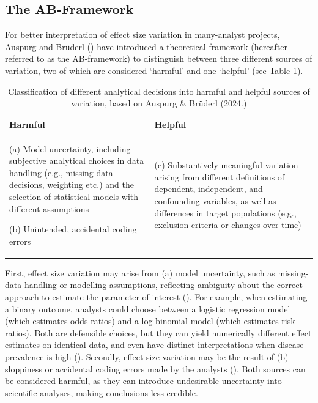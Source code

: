 \documentclass[
  man,
  floatsintext,
  longtable,
  nolmodern,
  notxfonts,
  notimes,
  colorlinks=true,linkcolor=blue,citecolor=blue,urlcolor=blue]{apa7}
\begin{document}
\subsection{The AB-Framework}\label{the-ab-framework}

For better interpretation of effect size variation in many-analyst
projects, Auspurg and Brüderl ()
have introduced a theoretical framework (hereafter referred to as the
AB-framework) to distinguish between three different sources of
variation, two of which are considered `harmful' and one `helpful' (see
Table \ref{tab:AB_framework}).

\begin{table}
\centering
\caption{Classification of different analytical decisions into harmful and helpful sources of variation, based on Auspurg \& Brüderl (2024.)}
\label{tab:AB_framework}
\begin{threeparttable}
\footnotesize
\setlength{\tabcolsep}{10pt}
\renewcommand{\arraystretch}{1.2}

\begin{tabular}{
>{\RaggedRight\arraybackslash}p{7.2cm}
>{\RaggedRight\arraybackslash}p{7.2cm}
}
\toprule
\textbf{Harmful} & \textbf{Helpful} \\
\midrule

(a) Model uncertainty, including subjective analytical choices in data handling (e.g., missing data decisions, weighting etc.) and the selection of statistical models with different assumptions

\vspace{0.4em}
(b) Unintended, accidental coding errors
&
(c) Substantively meaningful variation arising from different definitions of dependent, independent, and confounding variables, as well as differences in target populations (e.g., exclusion criteria or changes over time) \\

\bottomrule
\end{tabular}

\end{threeparttable}
\end{table}

First, effect size variation may arise from (a) model uncertainty, such
as missing-data handling or modelling assumptions, reflecting ambiguity
about the correct approach to estimate the parameter of interest
(). For
example, when estimating a binary outcome, analysts could choose between
a logistic regression model (which estimates odds ratios) and a
log-binomial model (which estimates risk ratios). Both are defensible
choices, but they can yield numerically different effect estimates on
identical data, and even have distinct interpretations when disease
prevalence is high (). Secondly, effect size variation may be the result of (b)
sloppiness or accidental coding errors made by the analysts
(). Both
sources can be considered harmful, as they can introduce undesirable
uncertainty into scientific analyses, making conclusions less credible.
\end{document}
